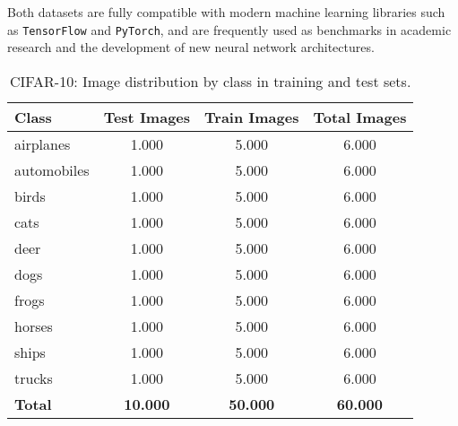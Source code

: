 \documentclass[journal,article,submit,pdftex,moreauthors]{Definitions/mdpi}
\begin{document}
Both datasets are fully compatible with modern machine learning libraries such as \texttt{TensorFlow} and \texttt{PyTorch}, and are frequently used as benchmarks in academic research and the development of new neural network architectures.


\begin{table}[H] 
\caption{CIFAR-10: Image distribution by class in training and test sets.\label{tab:distribuicao_imagens}}
\begin{tabularx}{\textwidth}{lCCC}
\toprule
\textbf{Class} & \textbf{Test Images} & \textbf{Train Images} & \textbf{Total Images} \\
\midrule
airplanes   & 1.000 & 5.000 & 6.000 \\
automobiles & 1.000 & 5.000 & 6.000 \\
birds       & 1.000 & 5.000 & 6.000 \\
cats        & 1.000 & 5.000 & 6.000 \\
deer        & 1.000 & 5.000 & 6.000 \\
dogs        & 1.000 & 5.000 & 6.000 \\
frogs       & 1.000 & 5.000 & 6.000 \\
horses      & 1.000 & 5.000 & 6.000 \\
ships       & 1.000 & 5.000 & 6.000 \\
trucks      & 1.000 & 5.000 & 6.000 \\
\midrule
\textbf{Total} & \textbf{10.000} & \textbf{50.000} & \textbf{60.000} \\
\bottomrule
\end{tabularx}
\end{table}
\end{document}
